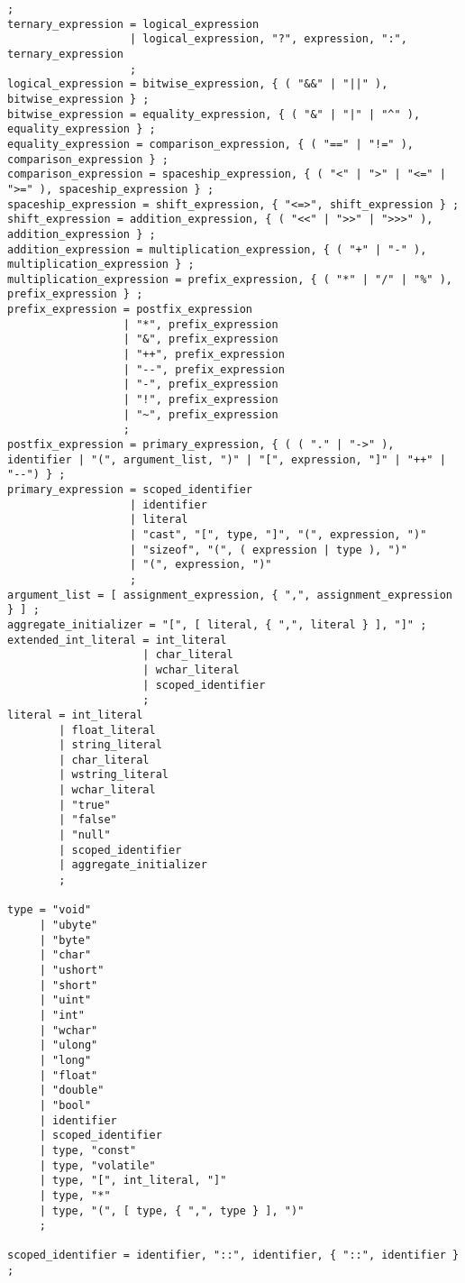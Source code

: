 \documentclass[letterpaper,12pt]{book}
\begin{document}
\begin{lstlisting}[breaklines=true]
                      ;
ternary_expression = logical_expression
                   | logical_expression, "?", expression, ":", ternary_expression
                   ;
logical_expression = bitwise_expression, { ( "&&" | "||" ), bitwise_expression } ;
bitwise_expression = equality_expression, { ( "&" | "|" | "^" ), equality_expression } ;
equality_expression = comparison_expression, { ( "==" | "!=" ), comparison_expression } ;
comparison_expression = spaceship_expression, { ( "<" | ">" | "<=" | ">=" ), spaceship_expression } ;
spaceship_expression = shift_expression, { "<=>", shift_expression } ;
shift_expression = addition_expression, { ( "<<" | ">>" | ">>>" ), addition_expression } ;
addition_expression = multiplication_expression, { ( "+" | "-" ), multiplication_expression } ;
multiplication_expression = prefix_expression, { ( "*" | "/" | "%" ), prefix_expression } ;
prefix_expression = postfix_expression
                  | "*", prefix_expression
                  | "&", prefix_expression
                  | "++", prefix_expression
                  | "--", prefix_expression
                  | "-", prefix_expression
                  | "!", prefix_expression
                  | "~", prefix_expression
                  ;
postfix_expression = primary_expression, { ( ( "." | "->" ), identifier | "(", argument_list, ")" | "[", expression, "]" | "++" | "--") } ;
primary_expression = scoped_identifier
                   | identifier
                   | literal
                   | "cast", "[", type, "]", "(", expression, ")"
                   | "sizeof", "(", ( expression | type ), ")"
                   | "(", expression, ")"
                   ;
argument_list = [ assignment_expression, { ",", assignment_expression } ] ;
aggregate_initializer = "[", [ literal, { ",", literal } ], "]" ;
extended_int_literal = int_literal
                     | char_literal
                     | wchar_literal
                     | scoped_identifier
                     ;
literal = int_literal
        | float_literal
        | string_literal
        | char_literal
        | wstring_literal
        | wchar_literal
        | "true"
        | "false"
        | "null"
        | scoped_identifier
        | aggregate_initializer
        ;

type = "void"
     | "ubyte"
     | "byte"
     | "char"
     | "ushort"
     | "short"
     | "uint"
     | "int"
     | "wchar"
     | "ulong"
     | "long"
     | "float"
     | "double"
     | "bool"
     | identifier
     | scoped_identifier
     | type, "const"
     | type, "volatile"
     | type, "[", int_literal, "]"
     | type, "*"
     | type, "(", [ type, { ",", type } ], ")"
     ;

scoped_identifier = identifier, "::", identifier, { "::", identifier } ;
\end{lstlisting}
\end{document}
